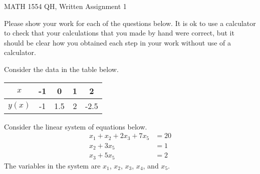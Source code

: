 \documentclass[11pt]{exam}
\begin{document}
\thispagestyle{empty} %
\thispagestyle{empty} %
\begin{center}
    \Large{MATH 1554 QH, Written Assignment 1}
\end{center}
\noindent Please show your work for each of the questions below. It is ok to use a calculator to check that your calculations that you made by hand were correct, but it should be clear how you obtained each step in your work without use of a calculator. 

\begin{questions}

    \question[4] Consider the data in the table below. 
        \begin{table}[h]\small
        \begin{center}
        \begin{tabular}{|c|c|c|c|c|} \hline
        $x$ & -1&0&1&2 \\ \hline
        $y(x)$ & -1 & 1.5 &2& -2.5 \\ \hline
        \end{tabular}
        \end{center}
        \end{table}           
    \question[5] Consider the linear system of equations below. 
    \begin{align}
        x_1+x_2+2x_3 +7x_5 &= 20 \\
        x_2 + 3x_5 &= 1 \\
        x_3 +5x_5 &= 2
    \end{align}
    The variables in the system are $x_1$, $x_2$, $x_3$, $x_4$, and $x_5$.
    \begin{parts}

\end{parts}
\end{questions}
\end{document}
